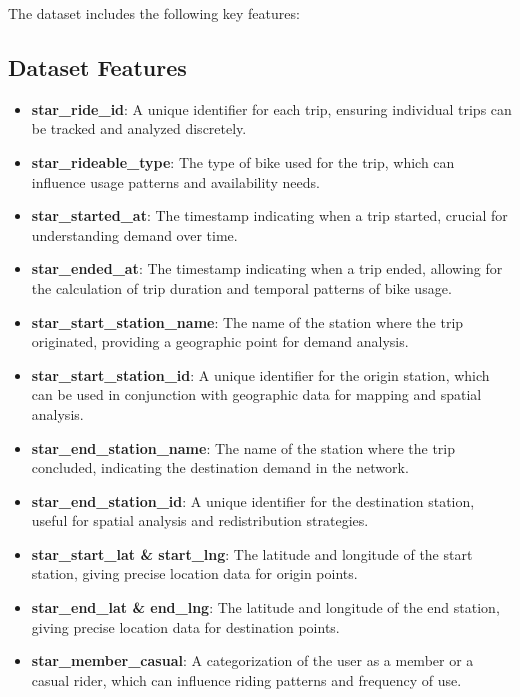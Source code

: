 \documentclass[12pt, a4paper]{article}
\begin{document}
    The dataset includes the following key features:\newline

    \subsection{Dataset Features}\label{subsec:dataset-features}
    \begin{itemize}
        \item \textbf{star\_ride\_id}: A unique identifier for each trip, ensuring individual trips can be tracked and analyzed discretely.
        \item \textbf{star\_rideable\_type}: The type of bike used for the trip, which can influence usage patterns and availability needs.
        \item \textbf{star\_started\_at}: The timestamp indicating when a trip started, crucial for understanding demand over time.
        \item \textbf{star\_ended\_at}: The timestamp indicating when a trip ended, allowing for the calculation of trip duration and temporal patterns of bike usage.
        \item \textbf{star\_start\_station\_name}: The name of the station where the trip originated, providing a geographic point for demand analysis.
        \item \textbf{star\_start\_station\_id}: A unique identifier for the origin station, which can be used in conjunction with geographic data for mapping and spatial analysis.
        \item \textbf{star\_end\_station\_name}: The name of the station where the trip concluded, indicating the destination demand in the network.
        \item \textbf{star\_end\_station\_id}: A unique identifier for the destination station, useful for spatial analysis and redistribution strategies.
        \item \textbf{star\_start\_lat \& start\_lng}: The latitude and longitude of the start station, giving precise location data for origin points.
        \item \textbf{star\_end\_lat \& end\_lng}: The latitude and longitude of the end station, giving precise location data for destination points.
        \item \textbf{star\_member\_casual}: A categorization of the user as a member or a casual rider, which can influence riding patterns and frequency of use.
    \end{itemize}
\end{document}
